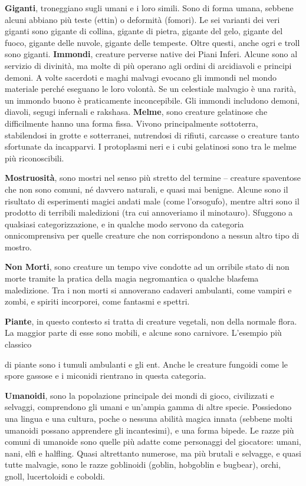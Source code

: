 \begin{multicols}{2}
\textbf{Giganti}, troneggiano sugli umani e i loro simili. Sono di forma
umana, sebbene alcuni abbiano più teste (ettin) o deformità (fomori). Le
sei varianti dei veri giganti sono gigante di collina, gigante di
pietra, gigante del gelo, gigante del fuoco, gigante delle nuvole,
gigante delle tempeste. Oltre questi, anche ogri e troll sono giganti.
\textbf{Immondi}, creature perverse native dei Piani Inferi. Alcune sono
al servizio di divinità, ma molte di più operano agli ordini di
arcidiavoli e principi demoni. A volte sacerdoti e maghi malvagi evocano
gli immondi nel mondo materiale perché eseguano le loro volontà. Se un
celestiale malvagio è una rarità, un immondo buono è praticamente
inconcepibile. Gli immondi includono demoni, diavoli, segugi infernali e
rakshasa. \textbf{Melme}, sono creature gelatinose che difficilmente
hanno una forma fissa. Vivono principalmente sottoterra, stabilendosi in
grotte e sotterranei, nutrendosi di rifiuti, carcasse o creature tanto
sfortunate da incapparvi. I protoplasmi neri e i cubi gelatinosi sono
tra le melme più riconoscibili.

\textbf{Mostruosità}, sono mostri nel senso più stretto del termine --
creature spaventose che non sono comuni, né davvero naturali, e quasi
mai benigne. Alcune sono il risultato di esperimenti magici andati male
(come l'orsogufo), mentre altri sono il prodotto di terribili
maledizioni (tra cui annoveriamo il minotauro). Sfuggono a qualsiasi
categorizzazione, e in qualche modo servono da categoria onnicomprensiva
per quelle creature che non corrispondono a nessun altro tipo di mostro.

\textbf{Non Morti}, sono creature un tempo vive condotte ad un orribile
stato di non morte tramite la pratica della magia negromantica o qualche
blasfema maledizione. Tra i non morti si annoverano cadaveri ambulanti,
come vampiri e zombi, e spiriti incorporei, come fantasmi e spettri.

\textbf{Piante}, in questo contesto si tratta di creature vegetali, non
della normale flora. La maggior parte di esse sono mobili, e alcune sono
carnivore. L'esempio più classico



di piante sono i tumuli ambulanti e gli ent. Anche le creature fungoidi
come le spore gassose e i miconidi rientrano in questa categoria.

\textbf{Umanoidi}, sono la popolazione principale dei mondi di gioco,
civilizzati e selvaggi, comprendono gli umani e un'ampia gamma di altre
specie. Possiedono una lingua e una cultura, poche o nessuna abilità
magica innata (sebbene molti umanoidi possano apprendere gli
incantesimi), e una forma bipede. Le razze più comuni di umanoide sono
quelle più adatte come personaggi del giocatore: umani, nani, elfi e
halfling. Quasi altrettanto numerose, ma più brutali e selvagge, e quasi
tutte malvagie, sono le razze goblinoidi (goblin, hobgoblin e bugbear),
orchi, gnoll, lucertoloidi e coboldi.


\end{multicols}
